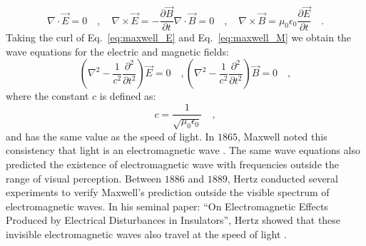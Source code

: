 \begin{subequations}
\begin{equation}
\label{eq:maxwell_E}
\nabla\cdot \vec{E}  = 0 \quad, \quad  \nabla\times\vec{E}   = -\frac{\partial\vec{B}}{\partial t}
\end{equation}
\begin{equation}
\label{eq:maxwell_M}
\nabla\cdot \vec{B}  = 0 \quad, \quad \nabla\times\vec{B}  =  \mu _0 \epsilon _0 \frac{\partial \vec{E}}{\partial t} \quad .
\end{equation}
\end{subequations}
Taking the curl of Eq.~\eqref{eq:maxwell_E} and Eq.~\eqref{eq:maxwell_M} we obtain the wave equations for the electric and magnetic fields:
\begin{subequations}
\begin{equation}
\label{eq:waveeq_E}
\left( \nabla ^2 - \frac{1}{c^2}\frac{\partial ^2}{\partial t^2}\right)\vec{E} = 0 \quad ,
\end{equation}
\begin{equation}
\label{eq:waveeq_B}
\left( \nabla ^2 - \frac{1}{c^2}\frac{\partial ^2}{\partial t^2}\right)\vec{B} = 0 \quad ,
\end{equation}
\end{subequations}
where the constant $c$ is defined as:
\begin{equation}
\label{eq:speed_of_light}
c = \frac{1}{\sqrt{\mu _0 \epsilon _0}} \quad ,
\end{equation}
and has the same value as the speed of light. In $\mathrm{1865}$, Maxwell noted this consistency that light is an electromagnetic wave \cite{ClerkMaxwell_1865}. The same wave equations also predicted the existence of electromagnetic wave with frequencies outside the range of visual perception. Between $1886$ and $1889$, Hertz conducted several experiments to verify Maxwell's prediction outside the visible spectrum of electromagnetic waves. In his seminal paper: ``On Electromagnetic Effects Produced by Electrical Disturbances in Insulators'', Hertz showed that these invisible electromagnetic waves also travel at the speed of light \cite{dagostino1975}.

